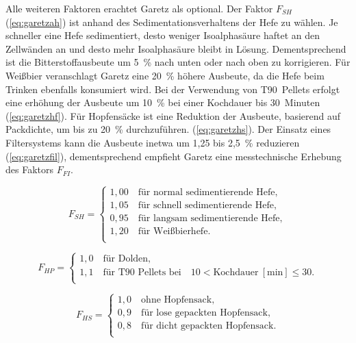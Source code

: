 \documentclass[a4paper,parskip=half]{scrartcl}
\newcommand{\umin}{\:[\textrm{min}]}
\newcommand{\FAH}{F_{\mathit{SH}}}
\newcommand{\FHF}{F_{\mathit{HP}}}
\newcommand{\FHS}{F_{\mathit{HS}}}
\newcommand{\FFil}{F_{\mathit{FI}}}
\begin{document}
Alle weiteren Faktoren erachtet Garetz als optional. Der Faktor $\FAH$ (\autoref{eq:garetzah}) ist anhand des Sedimentationsverhaltens der Hefe zu wählen. Je schneller eine Hefe sedimentiert, desto weniger Isoalphasäure haftet an den Zellwänden an und desto mehr Isoalphasäure bleibt in Lösung. Dementsprechend ist die Bitterstoffausbeute um 5~\% nach unten oder nach oben zu korrigieren.  Für Weißbier veranschlagt Garetz eine 20~\% höhere Ausbeute, da die Hefe beim Trinken ebenfalls konsumiert wird. Bei der Verwendung von T90~Pellets erfolgt eine erhöhung der Ausbeute um 10~\% bei einer Kochdauer bis 30~Minuten (\autoref{eq:garetzhf}). Für Hopfensäcke ist eine Reduktion der Ausbeute, basierend auf Packdichte, um bis zu 20~\% durchzuführen. (\autoref{eq:garetzhs}). Der Einsatz eines Filtersystems kann die Ausbeute inetwa um 1,25 bis 2,5~\% reduzieren (\autoref{eq:garetzfil}), dementsprechend empfieht Garetz eine messtechnische Erhebung des Faktors $\FFil$. \parencite[140\psq]{Garetz1994}

\begin{equation}
\FAH = \begin{cases}
1,00 \quad \text{für normal sedimentierende Hefe}, \\
1,05 \quad \text{für schnell sedimentierende Hefe}, \\
0,95 \quad \text{für langsam sedimentierende Hefe}, \\
1,20 \quad \text{für Weißbierhefe}. \\
\end{cases}
\label{eq:garetzah}
\end{equation}


\begin{equation}
\FHF = \begin{cases}
1,0 \quad \text{für Dolden}, \\
1,1 \quad \text{für T90~Pellets bei} \quad 10 < \text{Kochdauer} \umin \le 30. \\
\end{cases}
\label{eq:garetzhf}
\end{equation}

\begin{equation}
\FHS = \begin{cases}
1,0 \quad \text{ohne Hopfensack}, \\
0,9 \quad \text{für lose gepackten Hopfensack}, \\
0,8 \quad \text{für dicht gepackten Hopfensack}. \\
\end{cases}
\label{eq:garetzhs}
\end{equation}
\end{document}
